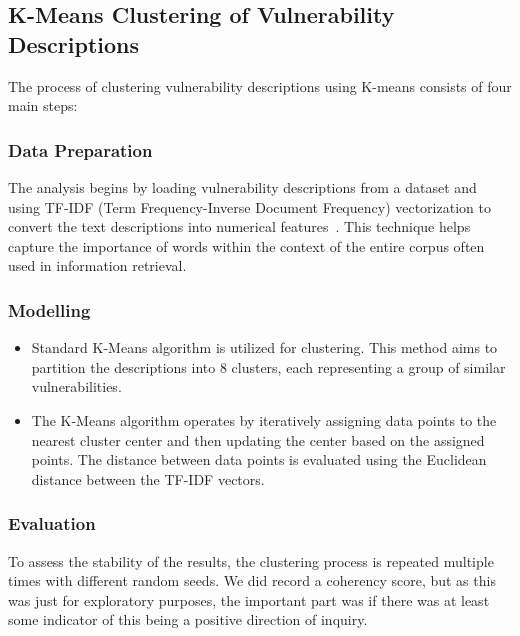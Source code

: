 \documentclass[12pt]{article}
\begin{document}
\subsection{K-Means Clustering of Vulnerability Descriptions}

The process of clustering vulnerability descriptions using K-means consists of four main steps:

\subsubsection{Data Preparation}

The analysis begins by loading vulnerability descriptions from a dataset and using TF-IDF
(Term Frequency-Inverse Document Frequency) vectorization to convert the text
descriptions into numerical features~\cite{tfidf}. This technique helps capture the
importance of words within the context of the entire corpus often used in information
retrieval.


\subsubsection{Modelling}

\begin{itemize}

	\item Standard K-Means algorithm is utilized for clustering. This method aims to partition the
	      descriptions into 8 clusters, each representing a group of similar
	      vulnerabilities.

	\item The K-Means algorithm operates by iteratively assigning data points to the nearest cluster
	      center and then updating the center based on the assigned points. The distance between
	      data points is evaluated using the Euclidean distance between the TF-IDF vectors.

\end{itemize}

\subsubsection{Evaluation}


To assess the stability of the results, the clustering process is repeated multiple times
with different random seeds. We did record a coherency score, but as this was just for exploratory
purposes, the important part was if there was at least some indicator of this being a positive
direction of inquiry.
\end{document}
